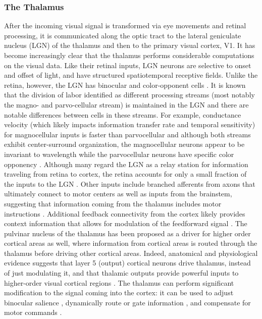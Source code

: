 \subsubsection{The Thalamus}
After the incoming visual signal is transformed via eye movements and retinal processing, it is communicated along the optic tract to the lateral geniculate nucleus (LGN) of the thalamus and then to the primary visual cortex, V1. It has become increasingly clear that the thalamus performs considerable computations on the visual data. Like their retinal inputs, LGN neurons are selective to onset and offset of light, and have structured spatiotemporal receptive fields. Unlike the retina, however, the LGN has binocular and color-opponent cells \parencite{schiller1978functional, schmielau1977role}. It is known that the division of labor identified as different processing streams (most notably the magno- and parvo-cellular stream) is maintained in the LGN and there are notable differences between cells in these streams. For example, conductance velocity (which likely impacts information transfer rate and temporal sensitivity) for magnocellular inputs is faster than parvocellular and although both streams exhibit center-surround organization, the magnocellular neurons appear to be invariant to wavelength while the parvocellular neurons have specific color opponency \parencite{schiller1978functional}. Although many regard the LGN as a relay station for information traveling from retina to cortex, the retina accounts for only a small fraction of the inputs to the LGN \parencite{weyand2016multifunctional}. Other inputs include branched afferents from axons that ultimately connect to motor centers as well as inputs from the brainstem, suggesting that information coming from the thalamus includes motor instructions \parencite{guillery2002thalamic}. Additional feedback connectivity from the cortex likely provides context information that allows for modulation of the feedforward signal \parencite{weyand2016multifunctional, ghodrati2017towards}. The pulvinar nucleus of the thalamus has been proposed as a driver for higher order cortical areas as well, where information from cortical areas is routed through the thalamus before driving other cortical areas. Indeed, anatomical and physiological evidence suggests that layer 5 (output) cortical neurons drive thalamus, instead of just modulating it, and that thalamic outputs provide powerful inputs to higher-order visual cortical regions \parencite{guillery2002thalamic}. The thalamus can perform significant modification to the signal coming into the cortex: it can be used to adjust binocular salience \parencite{schmielau1977role}, dynamically route or gate information \parencite{olshausen1993neurobiological, weyand2016multifunctional}, and compensate for motor commands \parencite{guillery2011branched}.


